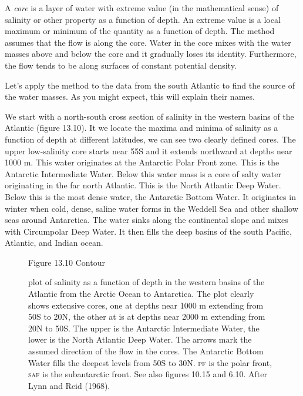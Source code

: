A \textit{core} is a layer of water with extreme
value (in the mathematical sense) of salinity or other property as a
function of depth. An extreme value is a local maximum or minimum of
the quantity as a function of depth. The method assumes that the flow
is along the core. Water in the core mixes with the water masses above
and below the core and it gradually loses its identity. Furthermore,
the flow tends to be along surfaces of constant potential density.

Let's apply the method to the data from the south Atlantic to find the
source of the water masses. As you might expect,
this will explain their names.

We start with a north-south cross section of salinity in the western
basins of the Atlantic (figure 13.10). It we locate the maxima and
minima of salinity as a function of depth at different latitudes, we
can see two clearly defined cores. The upper low-salinity core starts
near 55\degrees S and it extends northward at depths near 1000 m. This
water originates at the Antarctic Polar Front zone. This is the
Antarctic Intermediate Water. Below this water mass is
a core of salty water originating in the far north Atlantic. This is
the North Atlantic Deep Water. Below this is the most
dense water, the Antarctic Bottom Water. It originates in winter when cold, dense, saline
water forms in the Weddell Sea and other shallow seas around
Antarctica. The water sinks along the continental slope and mixes with
Circumpolar Deep Water. It then fills the deep basins of the south
Pacific, Atlantic, and Indian ocean.

\begin{figure}[t!]
\footnotesize
Figure 13.10 Contour \rule{0pt}{3ex}plot of salinity as a function of
depth in the western basins of the Atlantic from the Arctic Ocean to
Antarctica. The plot clearly shows extensive cores, one at depths near
1000 m extending from 50\degrees S to 20\degrees N, the other at is at
depths near 2000 m extending from 20\degrees N to 50\degrees S. The
upper is the Antarctic Intermediate Water, the lower is the North
Atlantic Deep Water. The arrows mark
the assumed direction of the flow in the cores. The Antarctic Bottom
Water fills the deepest levels from
50\degrees S to 30\degrees N. \textsc{pf} is the polar front,
\textsc{saf} is the subantarctic front. See also figures 10.15 and
6.10. After Lynn and Reid (1968).
\label{fig:Cores}
\vspace{-3ex}
\end{figure}

